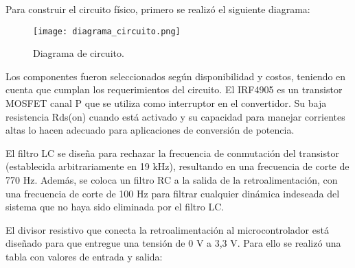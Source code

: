 Para construir el circuito físico, primero se realizó el siguiente diagrama:

\begin{figure}[H]
    \centering
    \texttt{[image: diagrama\_circuito.png]}
    \vspace{-0.25cm}
    \caption{Diagrama de circuito.}
    \label{fig:diagrama_circuito}
\end{figure}


Los componentes fueron seleccionados según disponibilidad y costos, teniendo en cuenta que cumplan los requerimientos del circuito.
El IRF4905 es un transistor MOSFET canal P que se utiliza como interruptor en el convertidor. Su baja resistencia Rds(on) cuando está activado y 
su capacidad para manejar corrientes altas lo hacen adecuado para aplicaciones de conversión de potencia.

El filtro LC se diseña para rechazar la frecuencia de conmutación del transistor (establecida arbitrariamente en 19 kHz),
resultando en una frecuencia de corte de 770 Hz. Además, se coloca un filtro RC a la salida de la retroalimentación, con una frecuencia
de corte de 100 Hz para filtrar cualquier dinámica indeseada del sistema que no haya sido eliminada por el filtro LC. 

El divisor resistivo que conecta la retroalimentación al microcontrolador está diseñado para que entregue una 
tensión de 0 V a 3,3 V. Para ello se realizó una tabla con valores de entrada y salida:

